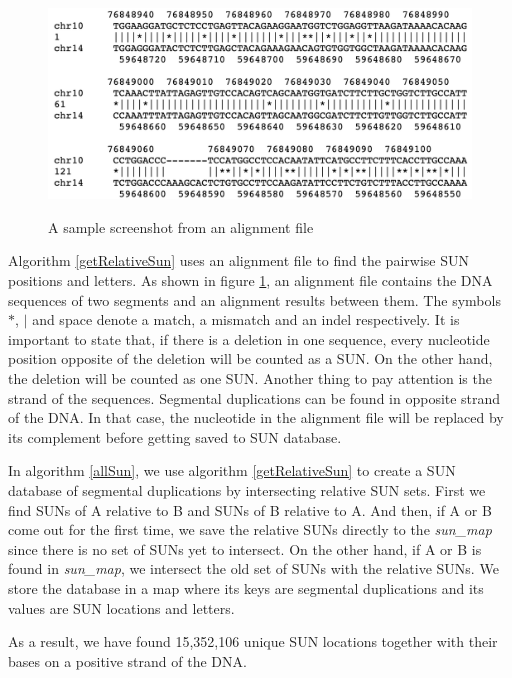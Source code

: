 \begin{figure}[ht]
    \centering
    \caption{A sample screenshot from an alignment file}
    \includegraphics[scale=0.4]{images/alignmentFile.png}
    \label{alignmentFile}
\end{figure}

Algorithm \ref{getRelativeSun} uses an alignment file to find the pairwise SUN positions and letters. As shown in figure \ref{alignmentFile}, an alignment file contains the DNA sequences of two segments and an alignment results between them. The symbols $*$, $|$ and space denote a match, a mismatch and an indel respectively. It is important to state that, if there is a deletion in one sequence, every nucleotide position opposite of the deletion will be counted as a SUN. On the other hand, the deletion will be counted as one SUN. Another thing to pay attention is the strand of the sequences. Segmental duplications can be found in opposite strand of the DNA. In that case, the nucleotide in the alignment file will be replaced by its complement before getting saved to SUN database.

In algorithm \ref{allSun}, we use algorithm \ref{getRelativeSun} to create a SUN database of segmental duplications by intersecting relative SUN sets. First we find SUNs of A relative to B and SUNs of B relative to A. And then, if A or B come out for the first time, we save the relative SUNs directly to the \textit{sun\_map} since there is no set of SUNs yet to intersect. On the other hand, if A or B is found in \textit{sun\_map}, we intersect the old set of SUNs with the relative SUNs. We store the database in a map where its keys are segmental duplications and its values are SUN locations and letters.

As a result, we have found 15,352,106 unique SUN locations together with their bases on a positive strand of the DNA. 

